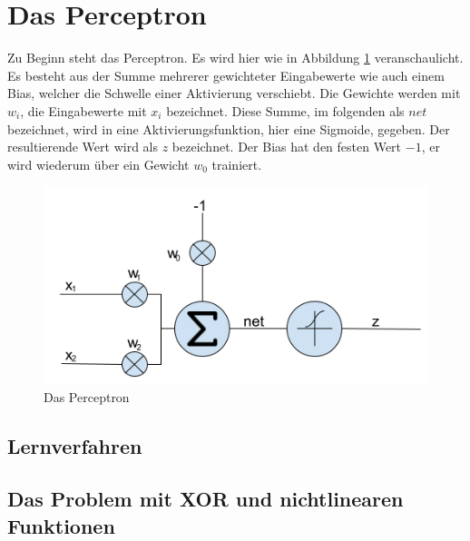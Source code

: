 \section{Das Perceptron}
Zu Beginn steht das Perceptron. Es wird hier wie in Abbildung \ref{fig:04_perceptron} veranschaulicht.
Es besteht aus der Summe mehrerer gewichteter Eingabewerte wie auch einem Bias, welcher
die Schwelle einer Aktivierung verschiebt. Die Gewichte werden mit $w_i$, die Eingabewerte mit $x_i$ bezeichnet.
Diese Summe, im folgenden als $net$ bezeichnet, wird in eine Aktivierungsfunktion,
hier eine Sigmoide, gegeben. Der resultierende Wert wird als $z$ bezeichnet. Der Bias hat den festen Wert $-1$,
er wird wiederum über ein Gewicht $w_0$ trainiert.

\begin{figure}[h!]
    \begin{center}
        \includegraphics[width=0.6\linewidth]{../common/01_perceptron/00_resources/00_perceptron.png}
    \end{center}
    \caption{Das Perceptron}
    \label{fig:04_perceptron}
\end{figure}

\subsection{Lernverfahren}

\subsection{Das Problem mit XOR und nichtlinearen Funktionen}